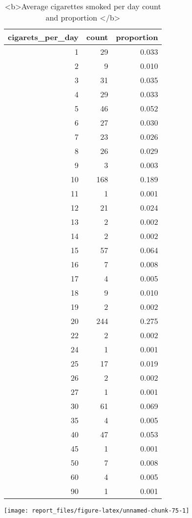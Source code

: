 \documentclass[
]{article}
\begin{document}
\begin{table}

\caption{\label{tab:unnamed-chunk-75}<b>Average cigarettes smoked per day  count and proportion </b>}
\centering
\begin{tabular}[t]{r|r|r}
\hline
cigarets\_per\_day & count & proportion\\
\hline
1 & 29 & 0.033\\
\hline
2 & 9 & 0.010\\
\hline
3 & 31 & 0.035\\
\hline
4 & 29 & 0.033\\
\hline
5 & 46 & 0.052\\
\hline
6 & 27 & 0.030\\
\hline
7 & 23 & 0.026\\
\hline
8 & 26 & 0.029\\
\hline
9 & 3 & 0.003\\
\hline
10 & 168 & 0.189\\
\hline
11 & 1 & 0.001\\
\hline
12 & 21 & 0.024\\
\hline
13 & 2 & 0.002\\
\hline
14 & 2 & 0.002\\
\hline
15 & 57 & 0.064\\
\hline
16 & 7 & 0.008\\
\hline
17 & 4 & 0.005\\
\hline
18 & 9 & 0.010\\
\hline
19 & 2 & 0.002\\
\hline
20 & 244 & 0.275\\
\hline
22 & 2 & 0.002\\
\hline
24 & 1 & 0.001\\
\hline
25 & 17 & 0.019\\
\hline
26 & 2 & 0.002\\
\hline
27 & 1 & 0.001\\
\hline
30 & 61 & 0.069\\
\hline
35 & 4 & 0.005\\
\hline
40 & 47 & 0.053\\
\hline
45 & 1 & 0.001\\
\hline
50 & 7 & 0.008\\
\hline
60 & 4 & 0.005\\
\hline
90 & 1 & 0.001\\
\hline
\end{tabular}
\end{table}

\begin{center}\texttt{[image: report\_files/figure-latex/unnamed-chunk-75-1]} \end{center}
\end{document}
